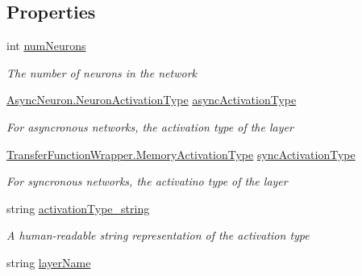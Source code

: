\subsection*{Properties}
\begin{DoxyCompactItemize}
\item 
int \hyperlink{class_n_n_gen_1_1_visualizer_layer_aaf9ed8af2561bf8203a81cba1bf324be}{num\+Neurons}
\begin{DoxyCompactList}\small\item\em The number of neurons in the network \end{DoxyCompactList}\item 
\hyperlink{class_n_n_gen_1_1_async_neuron_afe8460a52808d1587cbcc0a8e4e23b64}{Async\+Neuron.\+Neuron\+Activation\+Type} \hyperlink{class_n_n_gen_1_1_visualizer_layer_ace064a62dbac8d9ba6ab091f3275f809}{async\+Activation\+Type}
\begin{DoxyCompactList}\small\item\em For asyncronous networks, the activation type of the layer \end{DoxyCompactList}\item 
\hyperlink{class_n_n_gen_1_1_transfer_function_wrapper_aa338ffadb8fcdf76df75419374a51ff6}{Transfer\+Function\+Wrapper.\+Memory\+Activation\+Type} \hyperlink{class_n_n_gen_1_1_visualizer_layer_a4e3138e1ee1d9220ff8c53d0ac860f14}{sync\+Activation\+Type}
\begin{DoxyCompactList}\small\item\em For syncronous networks, the activatino type of the layer \end{DoxyCompactList}\item 
string \hyperlink{class_n_n_gen_1_1_visualizer_layer_a2f19de515420357a18d890cec3a3e43b}{activation\+Type\+\_\+string}
\begin{DoxyCompactList}\small\item\em A human-\/readable string representation of the activation type \end{DoxyCompactList}\item 
string \hyperlink{class_n_n_gen_1_1_visualizer_layer_adf0f91a6cf7dd357ff14b44f5c967a5f}{layer\+Name}

\end{DoxyCompactItemize}

